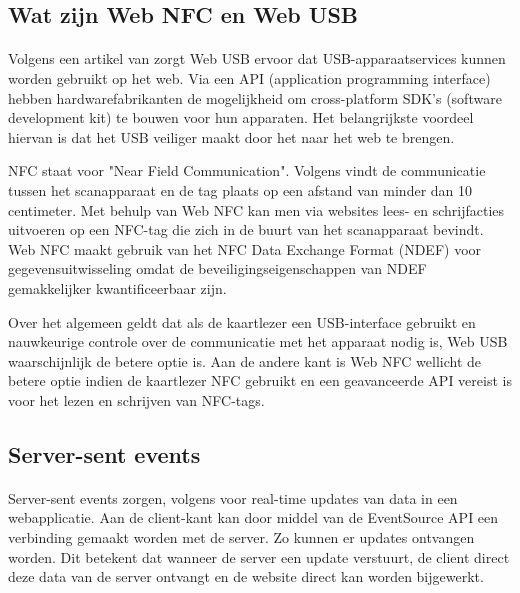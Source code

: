 \bigskip
\subsection{Wat zijn Web NFC en Web USB}
\paragraph{}
Volgens een artikel van \textcite{FrançoisBeaufortUSB} zorgt Web USB ervoor dat USB-apparaatservices kunnen worden gebruikt op het web. Via een API (application programming interface) hebben hardwarefabrikanten de mogelijkheid om \newline
cross-platform SDK's (software development kit) te bouwen voor hun apparaten. Het belangrijkste voordeel hiervan is dat het USB veiliger maakt door het naar het web te brengen.

NFC staat voor "Near Field Communication". Volgens \textcite{FrançoisBeaufortNFC} vindt de communicatie tussen het scanapparaat en de tag plaats op een afstand van minder dan 10 centimeter. Met behulp van Web NFC kan men via websites lees- en schrijfacties uitvoeren op een NFC-tag die zich in de buurt van het scanapparaat bevindt. Web NFC maakt gebruik van het NFC Data Exchange Format (NDEF) voor gegevensuitwisseling omdat de beveiligingseigenschappen van NDEF gemakkelijker kwantificeerbaar zijn.

Over het algemeen geldt dat als de kaartlezer een USB-interface gebruikt en nauwkeurige controle over de communicatie met het apparaat nodig is, Web USB waarschijnlijk de betere optie is. Aan de andere kant is Web NFC wellicht de betere optie indien de kaartlezer NFC gebruikt en een geavanceerde API vereist is voor het lezen en schrijven van NFC-tags.

\bigskip
\subsection{Server-sent events}
\paragraph{}
Server-sent events zorgen, volgens \textcite{DigitalOceanSSE} voor real-time updates van data in een webapplicatie. Aan de client-kant kan door middel van de EventSource API een verbinding gemaakt worden met de server. Zo kunnen er updates ontvangen worden. Dit betekent dat wanneer de server een update verstuurt, de client direct deze data van de server ontvangt en de website direct kan worden bijgewerkt.

